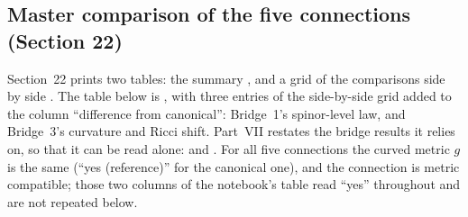 \subsection{Master comparison of the five connections (Section 22)}
\label{csc:master}\label{sec:6.11}

Section~22 prints two tables: the summary , and a grid of the
comparisons side by side . The table below is ,
with three entries of the side-by-side grid added to the column ``difference from canonical'':
Bridge~1's spinor-level law, and Bridge~3's curvature and Ricci shift. Part~VII restates the bridge
results it relies on, so that it can be read alone:  
and . For all five connections
the curved metric $g$ is the same (``yes (reference)'' for the canonical one), and the connection
is metric compatible; those two columns of the notebook's table read ``yes'' throughout and are
not repeated below.

